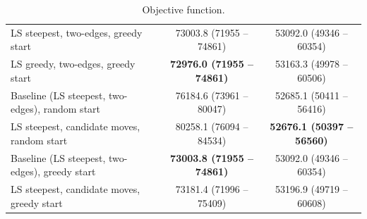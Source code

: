 \documentclass[11pt,a4paper]{article}
\begin{document}
\begin{table}[H]
\begin{tabular}{lcc}
LS steepest, two-edges, greedy start & 73003.8 (71955 -- 74861) & 53092.0 (49346 -- 60354) \\
LS greedy, two-edges, greedy start & \textbf{72976.0 (71955 -- 74861)} & 53163.3 (49978 -- 60506) \\
\midrule
Baseline (LS steepest, two-edges), random start & 76184.6 (73961 -- 80047) & 52685.1 (50411 -- 56416) \\
LS steepest, candidate moves, random start & 80258.1 (76094 -- 84534) & \textbf{52676.1 (50397 -- 56560)} \\
Baseline (LS steepest, two-edges), greedy start & \textbf{73003.8 (71955 -- 74861)} & 53092.0 (49346 -- 60354) \\
LS steepest, candidate moves, greedy start & 73181.4 (71996 -- 75409) & 53196.9 (49719 -- 60608) \\
\bottomrule
\end{tabular}
\caption{Objective function.}
\end{table}
\end{document}

